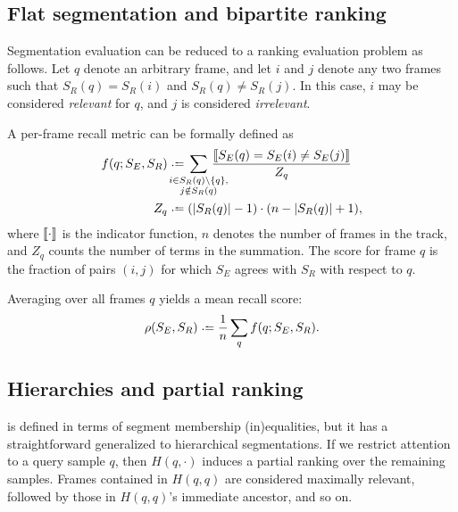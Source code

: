 \documentclass{article}
\begin{document}
\subsection{Flat segmentation and bipartite ranking}

Segmentation evaluation can be reduced to a ranking evaluation problem as follows.
Let $q$ denote an arbitrary frame, and let $i$ and $j$ denote any two frames such that $S_R(q) = S_R(i)$ and $S_R(q) \neq S_R(j)$.
In this case, $i$ may be considered \emph{relevant} for $q$, and $j$ is considered \emph{irrelevant}.

A per-frame recall metric can be formally defined as
\begin{align}
f(q ; S_E, S_R) &\defeq  \hspace{-1.5em} \sum_{\substack{i \in S_R(q) \setminus \{q\},\\ j \notin S_R(q)}}
\hspace{-1.5em}\frac{\ind{S_E(q) = S_E(i) \neq S_E(j) }}{Z_q} \label{flatrecall}\\
Z_q &\defeq (|S_R(q)| - 1)\cdot (n - |S_R(q)| + 1), \notag
\end{align}
where $\left\llbracket\cdot\right\rrbracket$ is the indicator function, $n$ denotes the number of frames in the track, and $Z_q$
counts the number of terms in the summation.
The score for frame $q$ is the fraction of pairs $(i, j)$ for which $S_E$
agrees with $S_R$ with respect to $q$.

Averaging over all frames $q$ yields a mean recall score:
\begin{equation}
\rho(S_E, S_R) \defeq \frac{1}{n} \sum_q f(q ; S_E, S_R).\label{avgrecall}
\end{equation}


\subsection{Hierarchies and partial ranking}

 is defined in terms of segment membership (in)equalities, but it has a straightforward 
generalized to hierarchical segmentations.
If we restrict attention to a query sample $q$, then $H(q, \cdot)$ induces a partial ranking over the remaining samples.
Frames contained in $H(q, q)$ are considered maximally relevant, followed by those in $H(q, q)$'s immediate ancestor, and so on.
\end{document}

